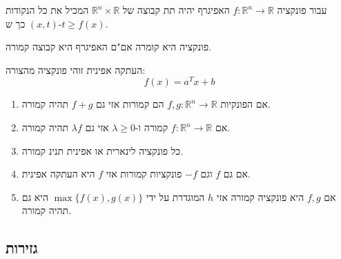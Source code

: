 \documentclass{tstextbook}
\begin{document}
\begin{definition}[אפיגרף]
עבור פונקציה \(f:\mathbb{R}^{n}\to \mathbb{R}\) האפיגרף יהיה תת קבוצה של \(\mathbb{R}^{n}\times \mathbb{R}\) המכיל את כל הנקודות \((x,t)\) כך ש-\(t\geq f(x)\).

\end{definition}
\begin{proposition}
פונקציה היא קומרה אם"ם האפיגרף היא קבוצה קמורה.

\end{proposition}
\begin{reminder}
העתקה אפינית זוהי פונקציה מהצורה:
$$f(x)=a^{T}x+b$$

\end{reminder}
\begin{proposition}
  \begin{enumerate}
    \item אם הפונקיות \(f,g:\mathbb{R}^{n}\to \mathbb{R}\) הם קמורות אזי גם \(f+g\) תהיה קמורה. 


    \item אם \(f:\mathbb{R}^{n}\to \mathbb{R}\) קמורה ו-\(\lambda \geq 0\) אזי גם \(\lambda f\) תהיה קמורה. 


    \item כל פונקציה לינארית או אפינית תנינ קמורה. 


    \item אם גם \(f\) וגם \(-f\) פונקציות קמורות אזי \(f\) היא העתקה אפינית. 


    \item אם \(f,g\) היא פונקציה קמורה אזי \(h\) המוגדרת על ידי \(\max\{ f(x),g(x) \}\) היא גם תהיה קמורה. 


  \end{enumerate}
\end{proposition}
\subsection{גזירות}
\end{document}
